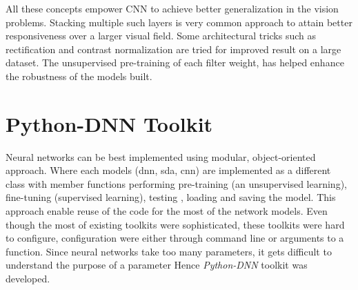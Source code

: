 \par All these concepts empower CNN to achieve better generalization in the vision problems. Stacking multiple such layers is very common approach to attain better responsiveness over a larger visual field. Some architectural tricks such as rectification and contrast normalization are tried for improved result on a large dataset. The unsupervised pre-training of each filter weight, has helped enhance the robustness of the models built.

\section{Python-DNN Toolkit}
\label{sec:pyDNN}
Neural networks can be best implemented using modular, object-oriented approach. Where each models (dnn, sda, cnn) are implemented as a different class with member functions performing pre-training (an unsupervised learning), fine-tuning (supervised learning), testing , loading and saving the model. This approach enable reuse of the code for the most of the network models. Even though the most of existing toolkits were sophisticated, these toolkits were hard to configure, configuration were either through command line or arguments to a function. Since neural networks take too many parameters, it gets difficult to understand the purpose of a parameter Hence  \textit{Python-DNN} toolkit was developed.  
